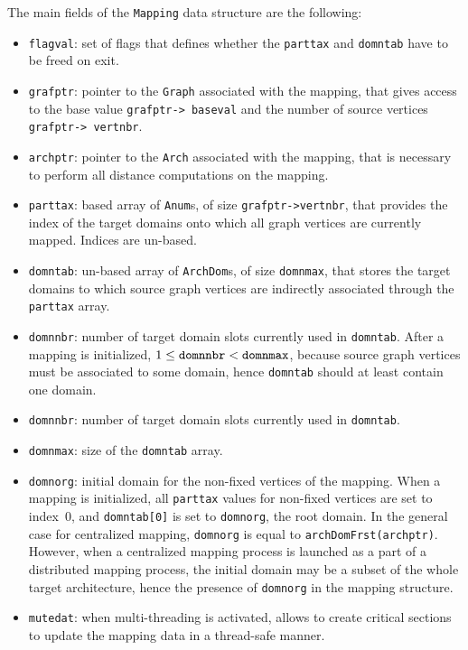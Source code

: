 The main fields of the \texttt{Mapping} data structure are the following:
\begin{itemize}
\item
\texttt{flagval}: set of flags that defines whether the
\texttt{parttax} and \texttt{domntab} have to be freed on exit.
\item
\texttt{grafptr}: pointer to the \texttt{Graph} associated with the
mapping, that gives access to the base value \texttt{grafptr->\lbt
baseval} and the number of source vertices \texttt{grafptr->\lbt
vertnbr}.
\item
\texttt{archptr}: pointer to the \texttt{Arch} associated with the
mapping, that is necessary to perform all distance computations on the
mapping.
\item
\texttt{parttax}: based array of \texttt{Anum}s, of size
\texttt{grafptr->\lbt vertnbr}, that provides the index of the target
domains onto which all graph vertices are currently mapped. Indices
are un-based.
\item
\texttt{domntab}: un-based array of \texttt{ArchDom}s, of size
\texttt{domnmax}, that stores the target domains to which source graph
vertices are indirectly associated through the \texttt{parttax} array.
\item
\texttt{domnnbr}: number of target domain slots currently used in
\texttt{domntab}. After a mapping is initialized, $1 \leq
\mbox{\texttt{domnnbr}} < \mbox{\texttt{domnmax}}$, because source
graph vertices must be associated to some domain, hence
\texttt{domntab} should at least contain one domain.
\item
\texttt{domnnbr}: number of target domain slots currently used in
\texttt{domntab}.
\item
\texttt{domnmax}: size of the \texttt{domntab} array.
\item
\texttt{domnorg}: initial domain for the non-fixed vertices of the
mapping. When a mapping is initialized, all \texttt{parttax} values
for non-fixed vertices are set to index~$0$, and \texttt{domntab[0]}
is set to \texttt{domnorg}, the root domain. In the general case for
centralized mapping, \texttt{domnorg} is equal to
\texttt{archDomFrst(archptr)}. However, when a centralized mapping
process is launched as a part of a distributed mapping process, the
initial domain may be a subset of the whole target architecture, hence
the presence of \texttt{domnorg} in the mapping structure.
\item
\texttt{mutedat}: when multi-threading is activated, allows to create
critical sections to update the mapping data in a thread-safe manner.
\end{itemize}
